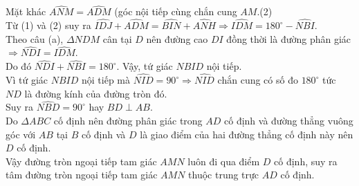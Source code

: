 \begin{bt}
{		Mặt khác $\widehat{ANM}=\widehat{{ADM}}$ (góc nội tiếp cùng chắn cung $AM$.\hfill (2)\\
		Từ (1) và (2) suy ra $\widehat{IDJ}+\widehat{ADM}=\widehat{BIN}+\widehat{ANH}\Rightarrow \widehat{IDM}=180^\circ-\widehat{NBI}$.\\
		Theo câu (a), $\Delta NDM$ cân tại $D$ nên đường cao $DI$ đồng thời là đường phân giác $\Rightarrow \widehat{NDI}=\widehat{IDM}$.\\
		Do đó $\widehat{NDI}+\widehat{NBI}=180^\circ$. Vậy, tứ giác $NBID$ nội tiếp.\\
		Vì tứ giác $NBID$ nội tiếp mà $\widehat{NID}=90^\circ \Rightarrow \widehat{NID}$ chắn cung có số đo $180^\circ$ tức $ND$ là đường kính của đường tròn đó.\\
		Suy ra $\widehat{NBD}=90^\circ$ hay $BD\perp AB$.\\
		Do $\Delta ABC$ cố định nên đường phân giác trong $AD$ cố định và đường thẳng vuông góc với $AB$ tại $B$ cố định và $D$ là giao điểm của hai đường thẳng cố định này nên $D$ cố định.\\
		Vậy đường tròn ngoại tiếp tam giác $AMN$ luôn đi qua điểm $D$ cố định, suy ra tâm đường tròn ngoại tiếp tam giác $AMN$ thuộc trung trực $AD$ cố định.
	}
\end{bt}

